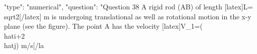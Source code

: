   {
    "type": "numerical",
    "question": "Question 38 A rigid rod (AB) of length [latex]L=\\sqrt{2}[/latex] m is undergoing translational as well as rotational motion in the x-y plane (see the figure). The point A has the velocity [latex]V_{1}=(\\hat{i}+2\\hat{j}) m/s[/la}
